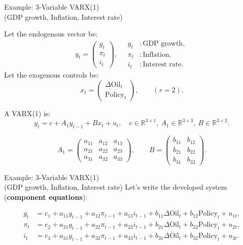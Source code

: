 \documentclass{beamer}
\begin{document}
\begin{frame}{Example: 3-Variable VARX(1)\\(GDP growth, Inflation, Interest rate)}
\small

Let the endogenous vector be:
\[
y_t =
\begin{pmatrix}
g_t \\ \pi_t \\ i_t
\end{pmatrix},
\quad
\begin{aligned}
g_t &: \text{GDP growth},\\
\pi_t &: \text{Inflation},\\
i_t &: \text{Interest rate}.
\end{aligned}
\]
Let the exogenous controls be:
\[
x_t =
\begin{pmatrix}
\Delta \text{Oil}_t \\ \text{Policy}_t
\end{pmatrix},
\qquad (r=2).
\]

\medskip

A VARX(1) is:
\[
y_t = c + A_1 y_{t-1} + B x_t + u_t,
\quad
c \in \mathbb{R}^{3\times 1},\ 
A_1 \in \mathbb{R}^{3\times 3},\ 
B \in \mathbb{R}^{3\times 2}.
\]

\[
A_1 =
\begin{pmatrix}
a_{11} & a_{12} & a_{13} \\
a_{21} & a_{22} & a_{23} \\
a_{31} & a_{32} & a_{33}
\end{pmatrix},
\qquad
B =
\begin{pmatrix}
b_{11} & b_{12} \\
b_{21} & b_{22} \\
b_{31} & b_{32}
\end{pmatrix}.
\]


\end{frame}


\begin{frame}{Example: 3-Variable VARX(1)\\(GDP growth, Inflation, Interest rate)}
Let's write the developed system (\textbf{component equations}):
\pause

\[
\begin{aligned}
g_t &= c_1 + a_{11} g_{t-1} + a_{12} \pi_{t-1} + a_{13} i_{t-1}
      + b_{11}\Delta \text{Oil}_t + b_{12}\text{Policy}_t + u_{1t},\\[4pt]
\pi_t &= c_2 + a_{21} g_{t-1} + a_{22} \pi_{t-1} + a_{23} i_{t-1}
      + b_{21}\Delta \text{Oil}_t + b_{22}\text{Policy}_t + u_{2t},\\[4pt]
i_t &= c_3 + a_{31} g_{t-1} + a_{32} \pi_{t-1} + a_{33} i_{t-1}
      + b_{31}\Delta \text{Oil}_t + b_{32}\text{Policy}_t + u_{3t}.
\end{aligned}
\]

\end{frame}
\end{document}

